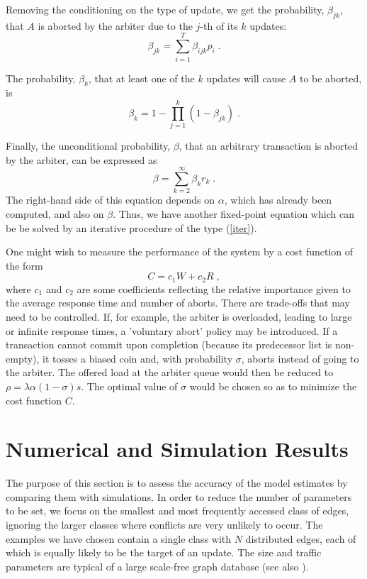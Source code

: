 \documentclass[runningheads]{llncs}
\begin{document}
Removing the conditioning on the type of update, we get the probability,
$\beta_{jk}$, that $A$ is aborted by the arbiter due to the $j$-th of
its $k$ updates:
\begin{equation} \label{bjk}
\beta_{jk} = \sum_{i=1}^T \beta_{ijk}p_i\;.
\end{equation}

The probability, $\beta_{k}$, that at least one of the $k$ updates will
cause $A$ to be aborted, is
\begin{equation} \label{bk}
\beta_{k} = 1 - \prod_{j=1}^k (1-\beta_{jk})\;.
\end{equation}

Finally, the unconditional probability, $\beta$, that an arbitrary
transaction is aborted by the arbiter, can be expressed as
\begin{equation} \label{b}
\beta = \sum_{k=2}^\infty \beta_k r_k\;.
\end{equation}
The right-hand side of this equation depends on $\alpha$, which has already
been computed, and also on $\beta$. Thus, we have another fixed-point
equation which can be be solved by an iterative procedure of the type
(\ref{iter}).

One might wish to measure the performance of the system by a cost function
of the form
\begin{equation} \label{C}
C = c_1 W + c_2 R\;,
\end{equation}
where $c_1$ and $c_2$ are some coefficients reflecting the relative
importance given to the average response time and number of aborts. There
are trade-offs that may need to be controlled. If, for example, the arbiter
is overloaded, leading to large or infinite response times, a 'voluntary
abort' policy may be introduced. If a transaction cannot commit upon
completion (because its predecessor list is non-empty), it tosses a
biased coin and, with probability $\sigma$, aborts instead of going to
the arbiter. The offered load at the arbiter queue would then be reduced to
$\rho = \lambda\alpha (1-\sigma )s$. The optimal value of $\sigma$ would
be chosen so as to minimize the cost function $C$.

\section{Numerical and Simulation Results}

The purpose of this section is to assess the accuracy of the model estimates
by comparing them with simulations. In order to reduce the number of
parameters to be set, we focus on the smallest and most frequently accessed
class of edges, ignoring the larger classes where conflicts are very unlikely
to occur. The examples we have chosen contain a single class with $N$
distributed edges, each of which is equally likely to be the target of an
update. The size and traffic parameters are typical of a large scale-free graph
database (see also \cite{emw}).
\end{document}
